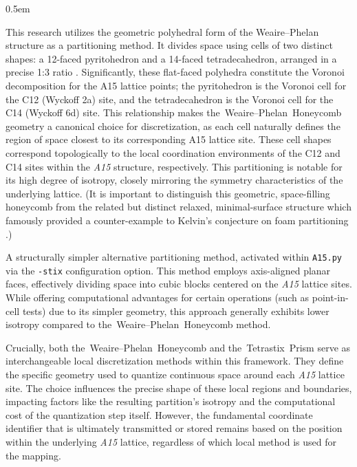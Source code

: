 \documentclass[10pt]{article}
\def\AAAB{\textit{A15}}
\def\WP{Weaire--Phelan}
\def\WPH{\WP{}~Honeycomb}
\def\TSP{Tetrastix~Prism}
\def\tWPH{the~\WP{}~Honeycomb}
\def\tTSP{the~\TSP{}}
\begin{document}
\begin{description} \itemsep0.5em
    \item[\WPH{} (WPH) Geometry:] This research utilizes the geometric polyhedral form of the \WP{} structure as a partitioning method. It divides space using cells of two distinct shapes: a 12-faced pyritohedron and a 14-faced tetradecahedron, arranged in a precise 1:3 ratio \cite{WeairePhelan1994}. Significantly, these flat-faced polyhedra constitute the Voronoi decomposition for the A15 lattice points; the pyritohedron is the Voronoi cell for the C12 (Wyckoff 2a) site, and the tetradecahedron is the Voronoi cell for the C14 (Wyckoff 6d) site. This relationship makes \tWPH{} geometry a canonical choice for discretization, as each cell naturally defines the region of space closest to its corresponding A15 lattice site. These cell shapes correspond topologically to the local coordination environments of the C12 and C14 sites within the \AAAB{} structure, respectively. This partitioning is notable for its high degree of isotropy, closely mirroring the symmetry characteristics of the underlying lattice. (It is important to distinguish this geometric, space-filling honeycomb from the related but distinct relaxed, minimal-surface structure which famously provided a counter-example to Kelvin's conjecture on foam partitioning \cite{Kelvin1887, Kusner1996, WeaireHutzler2001}.)
    \item[\TSP{} (TSP) Geometry:] A structurally simpler alternative partitioning method, activated within \texttt{A15.py} via the \texttt{-stix} configuration option. This method employs axis-aligned planar faces, effectively dividing space into cubic blocks centered on the \AAAB{} lattice sites. While offering computational advantages for certain operations (such as point-in-cell tests) due to its simpler geometry, this approach generally exhibits lower isotropy compared to \tWPH{} method.
\end{description}
Crucially, both \tWPH{} and \tTSP{} serve as interchangeable local discretization methods within this framework. They define the specific geometry used to quantize continuous space around each \AAAB{} lattice site. The choice influences the precise shape of these local regions and boundaries, impacting factors like the resulting partition's isotropy and the computational cost of the quantization step itself. However, the fundamental coordinate identifier that is ultimately transmitted or stored remains based on the position within the underlying \AAAB{} lattice, regardless of which local method is used for the mapping.
\end{document}
